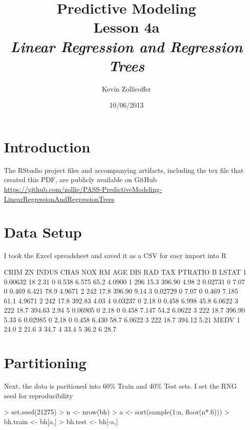 \documentclass{article}
\author{Kevin Zollicoffer}
\title{Predictive Modeling\\Lesson 4a\\\emph{Linear Regression and Regression Trees}}
\date{10/06/2013}
\begin{document}
\maketitle


\section*{Introduction}
The RStudio project files and accompanying artifacts, including the tex file that created this PDF, are publicly available on GitHub
\\
\url{https://github.com/zollie/PASS-PredictiveModeling-LinearRegressionAndRegressionTrees}

\section*{Data Setup}
I took the Excel spreadsheet and saved it as a CSV for easy import into R
\begin{Schunk}
\begin{Soutput}
     CRIM ZN INDUS CHAS   NOX    RM  AGE    DIS RAD TAX PTRATIO      B LSTAT
1 0.00632 18  2.31    0 0.538 6.575 65.2 4.0900   1 296    15.3 396.90  4.98
2 0.02731  0  7.07    0 0.469 6.421 78.9 4.9671   2 242    17.8 396.90  9.14
3 0.02729  0  7.07    0 0.469 7.185 61.1 4.9671   2 242    17.8 392.83  4.03
4 0.03237  0  2.18    0 0.458 6.998 45.8 6.0622   3 222    18.7 394.63  2.94
5 0.06905  0  2.18    0 0.458 7.147 54.2 6.0622   3 222    18.7 396.90  5.33
6 0.02985  0  2.18    0 0.458 6.430 58.7 6.0622   3 222    18.7 394.12  5.21
  MEDV
1 24.0
2 21.6
3 34.7
4 33.4
5 36.2
6 28.7
\end{Soutput}
\end{Schunk}


\section*{Partitioning}
Next, the data is paritioned into 60\% Train and 40\% Test sets. I set the RNG seed for reproducibility
\begin{Schunk}
\begin{Sinput}
> set.seed(21275)
> n <- nrow(bh)
> a <- sort(sample(1:n, floor(n*.6)))
> bh.train <- bh[a,]
> bh.test <- bh[-a,]
\end{Sinput}
\end{Schunk}
\end{document}
